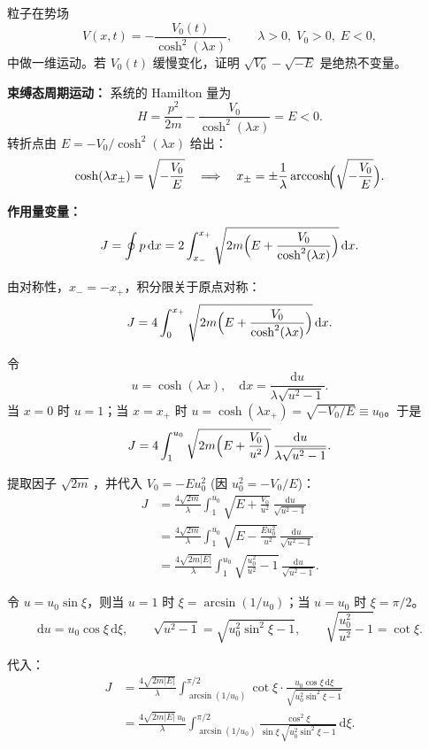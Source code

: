 \begin{question}
粒子在势场
\[
V(x,t)=-\frac{V_0(t)}{\cosh^2(\lambda x)},\qquad\lambda>0,\;V_0>0,\;E<0,
\]
中做一维运动。若 \(V_0(t)\) 缓慢变化，证明 \(\sqrt{V_0}-\sqrt{-E}\) 是绝热不变量。
\begin{solution}
\noindent\textbf{束缚态周期运动：} 系统的 Hamilton 量为
\[
H=\frac{p^2}{2m}-\frac{V_0}{\cosh^2(\lambda x)}=E<0.
\]
转折点由 \(E=-V_0/\cosh^2(\lambda x)\) 给出：
\[
\cosh(\lambda x_{\pm})=\sqrt{-\frac{V_0}{E}}\quad\Longrightarrow\quad
x_{\pm}=\pm\frac{1}{\lambda}\operatorname{arccosh}\!\Bigl(\sqrt{-\frac{V_0}{E}}\Bigr).
\]

\noindent\textbf{作用量变量：}
\[
J=\oint p\,\mathrm dx
=2\int_{x_-}^{x_+}\sqrt{2m\Bigl(E+\frac{V_0}{\cosh^2(\lambda x)}\Bigr)}\,\mathrm dx .
\]

由对称性，\(x_{-}=-x_{+}\)，积分限关于原点对称：
\[
J=4\int_0^{x_+}\sqrt{2m\Bigl(E+\frac{V_0}{\cosh^2(\lambda x)}\Bigr)}\,\mathrm dx .
\]

令
\[
u=\cosh(\lambda x),\quad \mathrm dx=\frac{\mathrm du}{\lambda\sqrt{u^2-1}} .
\]
当 \(x=0\) 时 \(u=1\)；当 \(x=x_{+}\) 时 \(u=\cosh(\lambda x_{+})=\sqrt{-V_0/E}\equiv u_0\)。于是
\[
J=4\int_1^{u_0}\sqrt{2m\Bigl(E+\frac{V_0}{u^2}\Bigr)}\,
\frac{\mathrm du}{\lambda\sqrt{u^2-1}} .
\]

提取因子 \(\sqrt{2m}\,\)，并代入 \(V_0= -E u_0^2\) (因 \(u_0^2=-V_0/E\))：
\[
\begin{aligned}
J&=\frac{4\sqrt{2m}}{\lambda}\int_1^{u_0}
\sqrt{E+\frac{V_0}{u^2}}\,\frac{\mathrm du}{\sqrt{u^2-1}} \\[4pt]
&=\frac{4\sqrt{2m}}{\lambda}\int_1^{u_0}
\sqrt{E-\frac{E u_0^2}{u^2}}\,\frac{\mathrm du}{\sqrt{u^2-1}} \\[4pt]
&=\frac{4\sqrt{2m|E|}}{\lambda}\int_1^{u_0}
\sqrt{\frac{u_0^2}{u^2}-1}\,\frac{\mathrm du}{\sqrt{u^2-1}} .
\end{aligned}
\]

令 \(u=u_0\sin\xi\)，则当 \(u=1\) 时 \(\xi=\arcsin(1/u_0)\)；当 \(u=u_0\) 时 \(\xi=\pi/2\)。
\[
\mathrm du=u_0\cos\xi\,\mathrm d\xi,\qquad
\sqrt{u^2-1}=\sqrt{u_0^2\sin^2\xi-1},\qquad
\sqrt{\frac{u_0^2}{u^2}-1}=\cot\xi .
\]

代入：
\[
\begin{aligned}
J&=\frac{4\sqrt{2m|E|}}{\lambda}\int_{\arcsin(1/u_0)}^{\pi/2}
\cot\xi\cdot\frac{u_0\cos\xi\,\mathrm d\xi}{\sqrt{u_0^2\sin^2\xi-1}} \\[4pt]
&=\frac{4\sqrt{2m|E|}\,u_0}{\lambda}\int_{\arcsin(1/u_0)}^{\pi/2}
\frac{\cos^2\xi}{\sin\xi\,\sqrt{u_0^2\sin^2\xi-1}}\,\mathrm d\xi .
\end{aligned}
\]


\end{solution}
\end{question}
